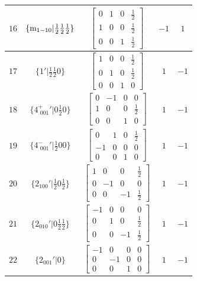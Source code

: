 \documentclass[fleqn,8pt]{jsarticle}
\begin{document}
\begin{longtable}{ccccc}
$ 16 $ & $ \{{\rm m}_{1-10}|\frac{1}{2} \frac{1}{2} \frac{1}{2}\} $ & $ \begin{bmatrix} 0 & 1 & 0 & \frac{1}{2} \\ 1 & 0 & 0 & \frac{1}{2} \\ 0 & 0 & 1 & \frac{1}{2} \end{bmatrix} $ & $ -1 $ & $ 1 $ \\ \hline
$ 17 $ & $ \{1{}'|\frac{1}{2} \frac{1}{2} 0\} $ & $ \begin{bmatrix} 1 & 0 & 0 & \frac{1}{2} \\ 0 & 1 & 0 & \frac{1}{2} \\ 0 & 0 & 1 & 0 \end{bmatrix} $ & $ 1 $ & $ -1 $ \\ \hline
$ 18 $ & $ \{4^{+}_{\,\,001}{}'|0 \frac{1}{2} 0\} $ & $ \begin{bmatrix} 0 & -1 & 0 & 0 \\ 1 & 0 & 0 & \frac{1}{2} \\ 0 & 0 & 1 & 0 \end{bmatrix} $ & $ 1 $ & $ -1 $ \\ \hline
$ 19 $ & $ \{4^{-}_{\,\,001}{}'|\frac{1}{2} 0 0\} $ & $ \begin{bmatrix} 0 & 1 & 0 & \frac{1}{2} \\ -1 & 0 & 0 & 0 \\ 0 & 0 & 1 & 0 \end{bmatrix} $ & $ 1 $ & $ -1 $ \\ \hline
$ 20 $ & $ \{2{}_{100}{}'|\frac{1}{2} 0 \frac{1}{2}\} $ & $ \begin{bmatrix} 1 & 0 & 0 & \frac{1}{2} \\ 0 & -1 & 0 & 0 \\ 0 & 0 & -1 & \frac{1}{2} \end{bmatrix} $ & $ 1 $ & $ -1 $ \\ \hline
$ 21 $ & $ \{2{}_{010}{}'|0 \frac{1}{2} \frac{1}{2}\} $ & $ \begin{bmatrix} -1 & 0 & 0 & 0 \\ 0 & 1 & 0 & \frac{1}{2} \\ 0 & 0 & -1 & \frac{1}{2} \end{bmatrix} $ & $ 1 $ & $ -1 $ \\ \hline
$ 22 $ & $ \{2{}_{001}{}'|0\} $ & $ \begin{bmatrix} -1 & 0 & 0 & 0 \\ 0 & -1 & 0 & 0 \\ 0 & 0 & 1 & 0 \end{bmatrix} $ & $ 1 $ & $ -1 $ \\ \hline

\end{longtable}
\end{document}

